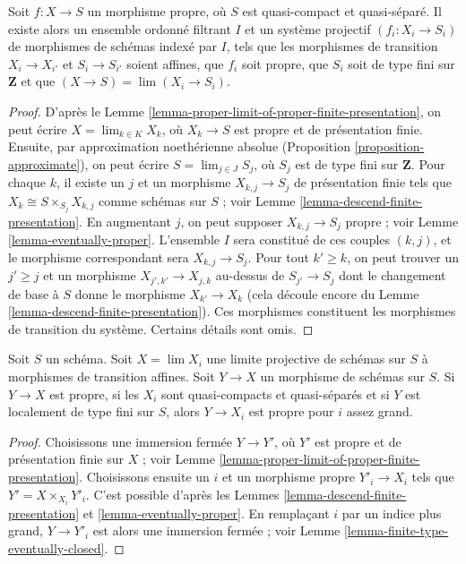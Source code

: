 \begin{lemma}
\label{lemma-proper-limit-of-proper-finite-presentation-noetherian}
Soit $f : X \to S$ un morphisme propre, où $S$ est quasi-compact et
quasi-séparé. Il existe alors un ensemble ordonné filtrant $I$ et un
système projectif $(f_i : X_i \to S_i)$ de morphismes de schémas indexé par $I$,
tels que les morphismes de transition $X_i \to X_{i'}$ et $S_i \to S_{i'}$
soient affines, que $f_i$ soit propre, que $S_i$ soit de type
fini sur $\mathbf{Z}$ et que
$(X \to S) = \lim (X_i \to S_i)$.
\end{lemma}

\begin{proof}
D'après le Lemme \ref{lemma-proper-limit-of-proper-finite-presentation},
on peut écrire $X = \lim_{k \in K} X_k$, où $X_k \to S$ est propre et
de présentation finie. Ensuite, par approximation noethérienne absolue
(Proposition \ref{proposition-approximate}), on peut
écrire $S = \lim_{j \in J} S_j$, où $S_j$ est de type fini sur $\mathbf{Z}$.
Pour chaque $k$, il existe un $j$ et un morphisme $X_{k, j} \to S_j$
de présentation finie tels que $X_k \cong S \times_{S_j} X_{k, j}$
comme schémas sur $S$ ; voir
Lemme \ref{lemma-descend-finite-presentation}.
En augmentant $j$, on peut supposer $X_{k, j} \to S_j$ propre ; voir
Lemme \ref{lemma-eventually-proper}. L'ensemble $I$ sera constitué
de ces couples $(k, j)$, et le morphisme correspondant sera $X_{k, j} \to S_j$.
Pour tout $k' \geq k$, on peut trouver un $j' \geq j$ et un morphisme
$X_{j', k'} \to X_{j, k}$ au-dessus de $S_{j'} \to S_j$ dont le changement de base à $S$
donne le morphisme $X_{k'} \to X_k$ (cela découle encore du
Lemme \ref{lemma-descend-finite-presentation}).
Ces morphismes constituent les morphismes de transition du système. Certains détails
sont omis.
\end{proof}

\begin{lemma}
\label{lemma-finite-type-eventually-proper}
Soit $S$ un schéma. Soit $X = \lim X_i$ une limite projective de
schémas sur $S$ à morphismes de transition affines. Soit $Y \to X$
un morphisme de schémas sur $S$.
Si $Y \to X$ est propre, si les $X_i$ sont quasi-compacts et quasi-séparés et si
$Y$ est localement de type fini sur $S$, alors $Y \to X_i$ est propre
pour $i$ assez grand.
\end{lemma}

\begin{proof}
Choisissons une immersion fermée $Y \to Y'$, où $Y'$ est propre et de présentation
finie sur $X$ ; voir
Lemme \ref{lemma-proper-limit-of-proper-finite-presentation}.
Choisissons ensuite un $i$ et un morphisme propre $Y'_i \to X_i$
tels que $Y' = X \times_{X_i} Y'_i$. C'est possible d'après les
Lemmes \ref{lemma-descend-finite-presentation} et
\ref{lemma-eventually-proper}. En remplaçant $i$
par un indice plus grand, $Y \to Y'_i$ est alors une immersion
fermée ; voir Lemme \ref{lemma-finite-type-eventually-closed}.
\end{proof}

